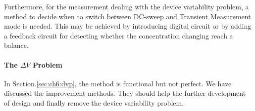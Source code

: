 Furthermore, for the measurement dealing with the device variability problem, a method to decide when to switch between DC-sweep and Transient Measurement mode is needed.
This may be achieved by introducing digital circuit or by adding a feedback circuit for detecting whether the concentration changing reach a balance.

\paragraph{The $\Delta V$ Problem}
In Section.\ref{sec:ch6:dvp}, the method is functional but not perfect.
We have discussed the improvement methods.
They should help the further development of design and finally remove the device variability problem.













%
